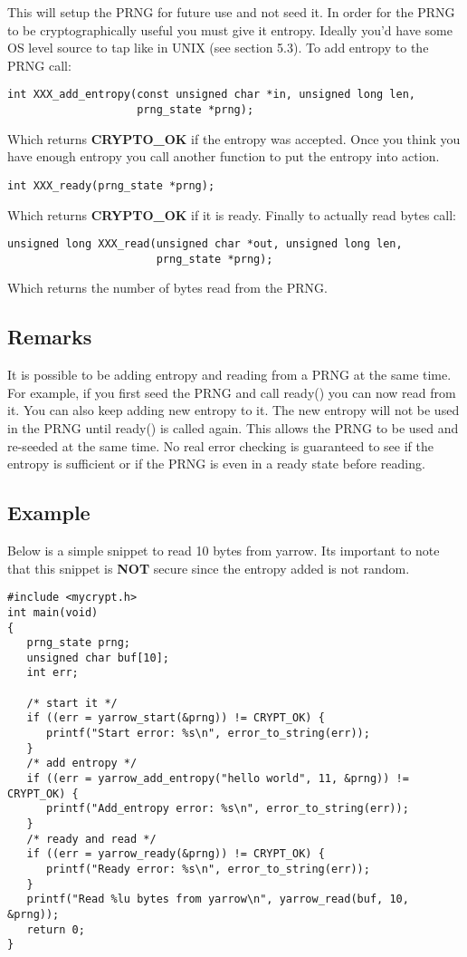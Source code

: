 \documentclass[b5paper]{book}
\begin{document}
This will setup the PRNG for future use and not seed it.  In order 
for the PRNG to be cryptographically useful you must give it entropy.  Ideally you'd have some OS level source to tap 
like in UNIX (see section 5.3).  To add entropy to the PRNG call:
\begin{verbatim}
int XXX_add_entropy(const unsigned char *in, unsigned long len, 
                    prng_state *prng);
\end{verbatim}

Which returns {\bf CRYPTO\_OK} if the entropy was accepted.  Once you think you have enough entropy you call another
function to put the entropy into action.
\begin{verbatim}
int XXX_ready(prng_state *prng);
\end{verbatim}

Which returns {\bf CRYPTO\_OK} if it is ready.  Finally to actually read bytes call:
\begin{verbatim}
unsigned long XXX_read(unsigned char *out, unsigned long len,
                       prng_state *prng);
\end{verbatim}

Which returns the number of bytes read from the PRNG.

\subsection{Remarks}

It is possible to be adding entropy and reading from a PRNG at the same time.  For example, if you first seed the PRNG
and call ready() you can now read from it.  You can also keep adding new entropy to it.  The new entropy will not be used
in the PRNG until ready() is called again.  This allows the PRNG to be used and re-seeded at the same time.  No real error 
checking is guaranteed to see if the entropy is sufficient or if the PRNG is even in a ready state before reading.

\subsection{Example}

Below is a simple snippet to read 10 bytes from yarrow.  Its important to note that this snippet is {\bf NOT} secure since
the entropy added is not random.

\begin{verbatim}
#include <mycrypt.h>
int main(void)
{
   prng_state prng;
   unsigned char buf[10];
   int err;
   
   /* start it */
   if ((err = yarrow_start(&prng)) != CRYPT_OK) {
      printf("Start error: %s\n", error_to_string(err));
   }
   /* add entropy */
   if ((err = yarrow_add_entropy("hello world", 11, &prng)) != CRYPT_OK) {
      printf("Add_entropy error: %s\n", error_to_string(err));
   }
   /* ready and read */
   if ((err = yarrow_ready(&prng)) != CRYPT_OK) {
      printf("Ready error: %s\n", error_to_string(err));
   }
   printf("Read %lu bytes from yarrow\n", yarrow_read(buf, 10, &prng));
   return 0;
}
\end{verbatim}
\end{document}
